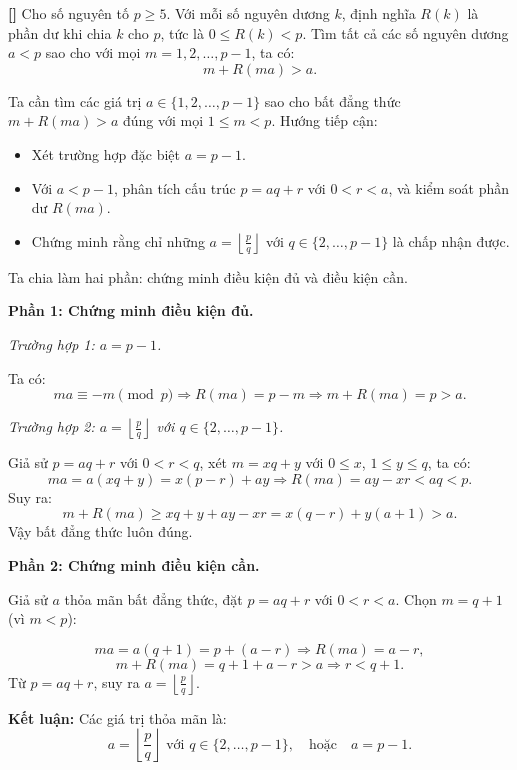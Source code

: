 \documentclass[../05-modular-arithmetic-a.tex]{subfiles}
\begin{document}
\begin{example*}\label{example:RMM-2015-P5}\textbf{[]}
	Cho số nguyên tố \( p \ge 5 \). Với mỗi số nguyên dương \( k \), định nghĩa \( R(k) \) là phần dư khi chia \( k \) cho \( p \), tức là \( 0 \le R(k) < p \).
	Tìm tất cả các số nguyên dương \( a < p \) sao cho với mọi \( m = 1, 2, \dots, p - 1 \), ta có:
	\[
		m + R(ma) > a.
	\]
\end{example*}

\begin{story*}
    Ta cần tìm các giá trị \( a \in \{1, 2, \dots, p-1\} \) sao cho bất đẳng thức \( m + R(ma) > a \) đúng với mọi \( 1 \le m < p \). 
    Hướng tiếp cận:
    \begin{itemize}[topsep=0pt, partopsep=0pt, itemsep=0pt]
        \item Xét trường hợp đặc biệt \( a = p - 1 \).
        \item Với \( a < p - 1 \), phân tích cấu trúc \( p = aq + r \) với \( 0 < r < a \), và kiểm soát phần dư \( R(ma) \).
        \item Chứng minh rằng chỉ những \( a = \left\lfloor \tfrac{p}{q} \right\rfloor \) với \( q \in \{2, \dots, p-1\} \) là chấp nhận được.
    \end{itemize}
\end{story*}

\bigbreak

\begin{soln}\footnotemark
	Ta chia làm hai phần: chứng minh điều kiện đủ và điều kiện cần.

	\textbf{Phần 1: Chứng minh điều kiện đủ.}

	\textit{Trường hợp 1: \( a = p - 1 \).}

	Ta có:
	\[
		ma \equiv -m \pmod{p} \Rightarrow R(ma) = p - m \Rightarrow m + R(ma) = p > a.
	\]

	\textit{Trường hợp 2: \( a = \left\lfloor \frac{p}{q} \right\rfloor \) với \( q \in \{2, \dots, p - 1\} \).}

	Giả sử \( p = aq + r \) với \( 0 < r < q \), xét \( m = xq + y \) với \( 0 \le x \), \( 1 \le y \le q \), ta có:
	\[
		ma = a(xq + y) = x(p - r) + ay \Rightarrow R(ma) = ay - xr < aq < p.
	\]
	Suy ra:
	\[
		m + R(ma) \ge xq + y + ay - xr = x(q - r) + y(a + 1) > a.
	\]
	Vậy bất đẳng thức luôn đúng.

	\textbf{Phần 2: Chứng minh điều kiện cần.}

	Giả sử \( a \) thỏa mãn bất đẳng thức, đặt \( p = aq + r \) với \( 0 < r < a \). Chọn \( m = q + 1 \) (vì \( m < p \)):

	\[
		ma = a(q + 1) = p + (a - r) \Rightarrow R(ma) = a - r,
	\]
	\[
		m + R(ma) = q + 1 + a - r > a \Rightarrow r < q + 1.
	\]
	Từ \( p = aq + r \), suy ra \( a = \left\lfloor \frac{p}{q} \right\rfloor \).

	\textbf{Kết luận:} Các giá trị thỏa mãn là:
	\[
		\boxed{
			a = \left\lfloor \frac{p}{q} \right\rfloor \text{ với } q \in \{2, \dots, p - 1\}, \quad \text{hoặc} \quad a = p - 1.
		}
	\]
\end{soln}

\end{document}
